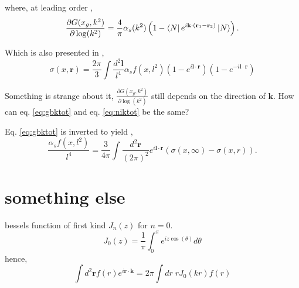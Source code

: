 \documentclass[12pt]{article}
\newcommand{\pairdot}[2]{ \mathbf{#1}\cdot\mathbf{#2}  }
\begin{document}
where, at leading order \cite{nikolaev1994},
\begin{equation}
\frac{\partial G(x_g,k^2)}{\partial \log(k^2)}=\frac{4}{\pi}\alpha_s(k^2) \left(1-\bra{N}e^{i\mathbf{k}\cdot (\mathbf{r}_1-\mathbf{r}_2)}\ket{N}\right).
\end{equation}



Which is also presented in \cite{gbk2002},
\begin{equation}
\sigma(x,\mathbf{r})=\frac{2\pi}{3}\int\frac{d^2 \mathbf{l}}{l^4}\alpha_s f(x,l^2) (1-e^{i \pairdot{l}{r}})(1-e^{-i \pairdot{l}{r}})
\label{eq:gbktot}
\end{equation}

{\color{red} Something is strange about it, $\frac{\partial G(x_g,k^2)}{\partial \log(k^2)}$ still depends on the direction of $\mathbf{k}$. How can eq. \ref{eq:gbktot} and eq. \ref{eq:niktot} be the same?}%

Eq. \ref{eq:gbktot} is inverted to yield \cite{gbk2002},
\begin{equation}
\frac{ \alpha_s f(x,l^2)}{l^4}=\frac{3}{4\pi} \int\frac{d^2 \mathbf{r}}{(2\pi)^2} e^{i\pairdot{l}{r}}\left(\sigma(x,\infty)-\sigma(x,r)\right).
\end{equation}

\section{something else}
bessels function of first kind $J_n(z)$ for $n=0$.
\begin{equation}
J_0(z)=\frac{1}{\pi}\int^\pi_0 e^{i z \cos(\theta)}d\theta
\end{equation}
hence,
\begin{equation}
\int d^2\mathbf{r} f(r) e^{i \mathbf{r}\cdot \mathbf{k}}=2\pi \int dr \;r J_0(kr) f(r)
\end{equation}






\newpage
\printbibliography
\end{document}
